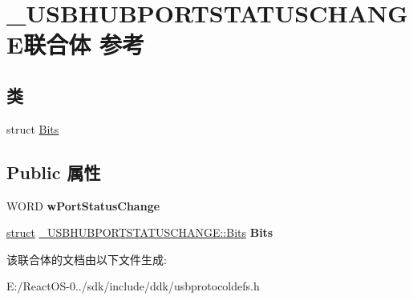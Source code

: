 \hypertarget{union___u_s_b_h_u_b_p_o_r_t_s_t_a_t_u_s_c_h_a_n_g_e}{}\section{\+\_\+\+U\+S\+B\+H\+U\+B\+P\+O\+R\+T\+S\+T\+A\+T\+U\+S\+C\+H\+A\+N\+G\+E联合体 参考}
\label{union___u_s_b_h_u_b_p_o_r_t_s_t_a_t_u_s_c_h_a_n_g_e}
\subsection*{类}
\begin{DoxyCompactItemize}
\item 
struct \hyperlink{struct___u_s_b_h_u_b_p_o_r_t_s_t_a_t_u_s_c_h_a_n_g_e_1_1_bits}{Bits}
\end{DoxyCompactItemize}
\subsection*{Public 属性}
\begin{DoxyCompactItemize}
\item 
\mbox{\label{union___u_s_b_h_u_b_p_o_r_t_s_t_a_t_u_s_c_h_a_n_g_e_a9c48dd45d41c807d001f720170efbf48}} 
W\+O\+RD {\bfseries w\+Port\+Status\+Change}
\item 
\mbox{\label{union___u_s_b_h_u_b_p_o_r_t_s_t_a_t_u_s_c_h_a_n_g_e_a36ff9c6713c3b391885391ef04f6457b}} 
\hyperlink{interfacestruct}{struct} \hyperlink{struct___u_s_b_h_u_b_p_o_r_t_s_t_a_t_u_s_c_h_a_n_g_e_1_1_bits}{\+\_\+\+U\+S\+B\+H\+U\+B\+P\+O\+R\+T\+S\+T\+A\+T\+U\+S\+C\+H\+A\+N\+G\+E\+::\+Bits} {\bfseries Bits}
\end{DoxyCompactItemize}


该联合体的文档由以下文件生成\+:\begin{DoxyCompactItemize}
\item 
E\+:/\+React\+O\+S-\/0../sdk/include/ddk/usbprotocoldefs.\+h\end{DoxyCompactItemize}
